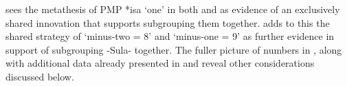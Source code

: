 \citet[26]{Blust1981} sees the metathesis of PMP *isa ‘one’ in
both  and  as evidence of an exclusively shared innovation that
supports subgrouping them together.
\citet[35f]{Collins1981} adds to this the shared strategy of ‘minus-two
= 8’ and ‘minus-one = 9’ as further evidence in support of
subgrouping -Sula- together.
The fuller picture of numbers in ,
along with additional data already presented in 
and  reveal other considerations discussed below.


